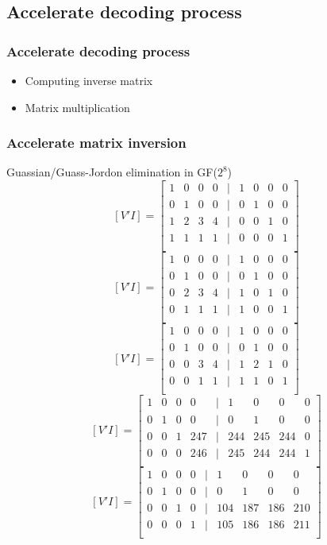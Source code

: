 \documentclass[slidestop,compress,mathserif]{beamer}
\begin{document}
\subsection{Accelerate decoding process}
\begin{frame}[options]
\frametitle{Accelerate decoding process}
\begin{itemize}
  \item Computing inverse matrix
  \item Matrix multiplication
\end{itemize}
\end{frame}

\begin{frame}[options]
\frametitle{Accelerate matrix inversion}
Guassian/Guass-Jordon elimination in GF($2^8$)
{
$$
[V' I] =
\begin{bmatrix}
1 & 0 & 0 & 0 & | & 1 & 0 & 0 & 0 \\
0 & 1 & 0 & 0 & | & 0 & 1 & 0 & 0 \\
1 & 2 & 3 & 4 & | & 0 & 0 & 1 & 0  \\
1 & 1 & 1 & 1 & | & 0 & 0 & 0 & 1  \\
\end{bmatrix}
$$
}
{
$$
[V' I] =
\begin{bmatrix}
1 & 0 & 0 & 0 & | & 1 & 0 & 0 & 0 \\
0 & 1 & 0 & 0 & | & 0 & 1 & 0 & 0 \\
0 & 2 & 3 & 4 & | & 1 & 0 & 1 & 0  \\
0 & 1 & 1 & 1 & | & 1 & 0 & 0 & 1  \\
\end{bmatrix}
$$
}
{
$$
[V' I] =
\begin{bmatrix}
1 & 0 & 0 & 0 & | & 1 & 0 & 0 & 0 \\
0 & 1 & 0 & 0 & | & 0 & 1 & 0 & 0 \\
0 & 0 & 3 & 4 & | & 1 & 2 & 1 & 0  \\
0 & 0 & 1 & 1 & | & 1 & 1 & 0 & 1  \\
\end{bmatrix}
$$
}
{
$$
[V' I] =
\begin{bmatrix}
1 & 0 & 0 & 0 & | & 1 & 0 & 0 & 0 \\
0 & 1 & 0 & 0 & | & 0 & 1 & 0 & 0 \\
0 & 0 & 1 & 247 & | & 244 & 245 & 244 & 0  \\
0 & 0 & 0 & 246 & | & 245 & 244 & 244 & 1  \\
\end{bmatrix}
$$
}
{
$$
[V' I] =
\begin{bmatrix}
1 & 0 & 0 & 0 & | & 1 & 0 & 0 & 0 \\
0 & 1 & 0 & 0 & | & 0 & 1 & 0 & 0 \\
0 & 0 & 1 & 0 & | & 104 & 187 & 186 & 210  \\
0 & 0 & 0 & 1 & | & 105 & 186 & 186 & 211  \\
\end{bmatrix}
$$
}


\end{frame}
\end{document}
